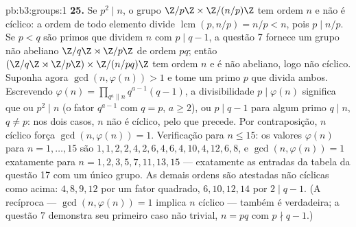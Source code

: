\begin{solution}{pb:b3:groups:1}
\textbf{25.} Se $p^2 \mid n$, o grupo $\Z/p\Z \times
\Z/(n/p)\Z$ tem ordem $n$ e não é cíclico:
a ordem de todo elemento divide $\operatorname{lcm}(p, n/p) = n/p < n$, pois $p \mid n/p$. Se $p < q$ são
primos que dividem $n$ com $p \mid
q - 1$, a questão 7 fornece um grupo não
abeliano $\Z/q\Z \rtimes
\Z/p\Z$ de ordem $pq$; então $(\Z/q\Z \rtimes \Z/p\Z) \times
\Z/(n/pq)\Z$ tem ordem $n$ e é não
abeliano, logo não cíclico. Suponha agora $\gcd(n, \varphi(n)) > 1$ e tome um primo $p$
que divida ambos. Escrevendo $\varphi(n) = \prod_{q^a \parallel
n} q^{a-1}(q - 1)$, a divisibilidade $p \mid \varphi(n)$ significa que
ou $p^2 \mid n$ (o fator $q^{a-1}$ com $q = p$, $a \geq 2$), ou $p \mid q - 1$ para algum
primo $q \mid n$, $q
\neq p$: nos dois casos, $n$ não é cíclico, pelo que
precede. Por contraposição, $n$ cíclico força $\gcd(n, \varphi(n)) = 1$. Verificação para
$n \leq 15$: os valores $\varphi(n)$ para $n = 1,
\dots, 15$ são $1, 1, 2, 2, 4, 2, 6, 4, 6, 4, 10, 4, 12, 6,
8$, e $\gcd(n, \varphi(n)) = 1$ exatamente para
$n = 1, 2, 3, 5,
7, 11, 13, 15$ --- exatamente as entradas da tabela da questão 17 com um único
grupo. As demais ordens são atestadas não cíclicas como acima: $4, 8, 9, 12$ por
um fator quadrado, $6, 10, 12, 14$ por $2 \mid q - 1$. (A recíproca --- $\gcd(n, \varphi(n)) = 1$ implica
$n$ cíclico --- também é verdadeira; a questão 7 demonstra seu
primeiro caso não trivial, $n = pq$ com $p \nmid q - 1$.)
\end{solution}
